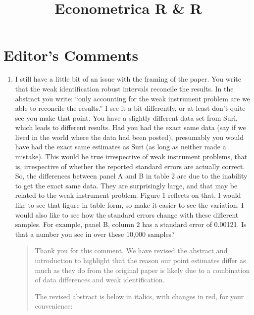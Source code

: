 \documentclass{article}[11pt]
\title{Econometrica R \& R}
\author{}
\date{}
\begin{document}
\setlength{\parindent}{0pt} %
\setlength{\parskip}{\smallskipamount}

\pagestyle{fancy}
\fancyhead{} %
\renewcommand{\thetable}{E-\arabic{table}}
\renewcommand{\thefigure}{E-\arabic{figure}}

\onehalfspacing
\section*{Editor's Comments}

\begin{enumerate}
\item I still have a little bit of an issue with the framing of the paper. 
You write that the weak identification robust intervals reconcile the results. 
In the abstract you write: ``only accounting for the weak instrument problem are we able to reconcile the results.'' I see it a bit differently, or at least don't quite see you make that point. You have a slightly different data set from Suri, which leads to different results. Had you had the exact same data (say if we lived in the world where the data had been posted), presumably you would have had the exact same estimates as Suri (as long as neither made a mistake). This would be true irrespective of weak instrument problems, that is, irrespective of whether the reported standard errors are actually correct. So, the differences between panel A and B in table 2 are due to the inability to get the exact same data. They are surprisingly large, and that may be related to the weak instrument problem. Figure 1 reflects on that. I would like to see that figure in table form, so make it easier to see the variation. I would also like to see how the standard errors change with these different samples. For example, panel B, column 2 has a standard error of 0.00121. Is that a number you see in over these 10,000 samples?
\begin{quote}
    Thank you for this comment. We have revised the abstract and introduction to highlight that the reason our point estimates differ as much as they do from the original paper is likely due to a combination of data differences and weak identification.

    The revised abstract is below in italics, with changes in red, for your convenience:


\end{quote}
\end{enumerate}
\end{document}
